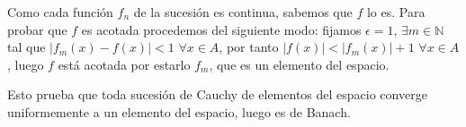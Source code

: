 \documentclass{article}
\begin{document}
\begin{flushleft}
  Como cada función $f_n$ de la sucesión es continua, sabemos que $f$
  lo es. Para probar que $f$ es acotada procedemos del siguiente modo:
  fijamos $\epsilon = 1$, $\exists m \in \mathbb{N}$ tal que
  $|f_m(x) - f(x)| < 1$ $\forall x \in A$, por tanto
  $|f(x)| < |f_m(x)| + 1$ $\forall x \in A$, luego $f$ está acotada
  por estarlo $f_m$, que es un elemento del espacio.
\end{flushleft}

\begin{flushleft}
  Esto prueba que toda sucesión de Cauchy de elementos del espacio
  converge uniformemente a un elemento del espacio, luego es de Banach.
\end{flushleft}
\end{document}
